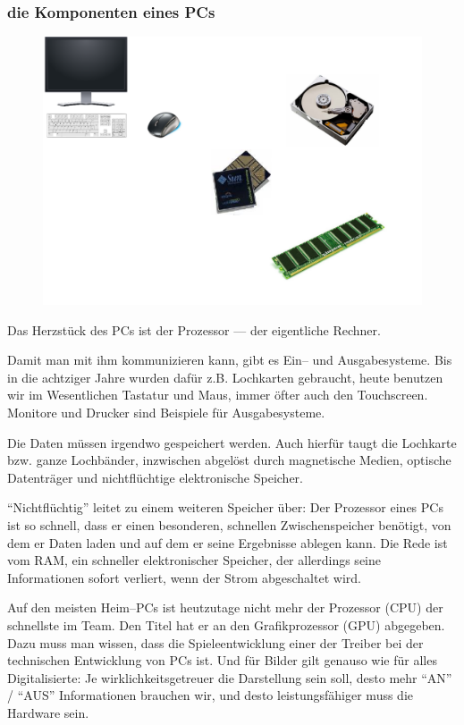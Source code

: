       \begin{frame}
        \frametitle{die Komponenten eines PCs}
        \begin{figure}
          \includegraphics[width=1\textwidth]{pics/pc-komponenten}
        \end{figure}
      \end{frame}

      Das Herzstück des PCs ist der Prozessor --- der eigentliche Rechner. 

      Damit man mit ihm kommunizieren kann, gibt es Ein-- und Ausgabesysteme. Bis in die achtziger Jahre wurden dafür z.B. Lochkarten gebraucht, heute benutzen wir im Wesentlichen Tastatur und Maus, immer öfter auch den Touchscreen. Monitore und Drucker sind Beispiele für Ausgabesysteme.

      Die Daten müssen irgendwo gespeichert werden. Auch hierfür taugt die Lochkarte bzw. ganze Lochbänder, inzwischen abgelöst durch magnetische Medien, optische Datenträger und nichtflüchtige elektronische Speicher.

      ``Nichtflüchtig'' leitet zu einem weiteren Speicher über: Der Prozessor eines PCs ist so schnell, dass er einen besonderen, schnellen Zwischenspeicher benötigt, von dem er Daten laden und auf dem er seine Ergebnisse ablegen kann. Die Rede ist vom RAM, ein schneller elektronischer Speicher, der allerdings seine Informationen sofort verliert, wenn der Strom abgeschaltet wird.

      Auf den meisten Heim--PCs ist heutzutage nicht mehr der Prozessor (CPU) der schnellste im Team. Den Titel hat er an den Grafikprozessor (GPU) abgegeben. Dazu muss man wissen, dass die Spieleentwicklung einer der Treiber bei der technischen Entwicklung von PCs ist. Und für Bilder gilt genauso wie für alles Digitalisierte: Je wirklichkeitsgetreuer die Darstellung sein soll, desto mehr ``AN'' / ``AUS'' Informationen brauchen wir, und desto leistungsfähiger muss die Hardware sein.

